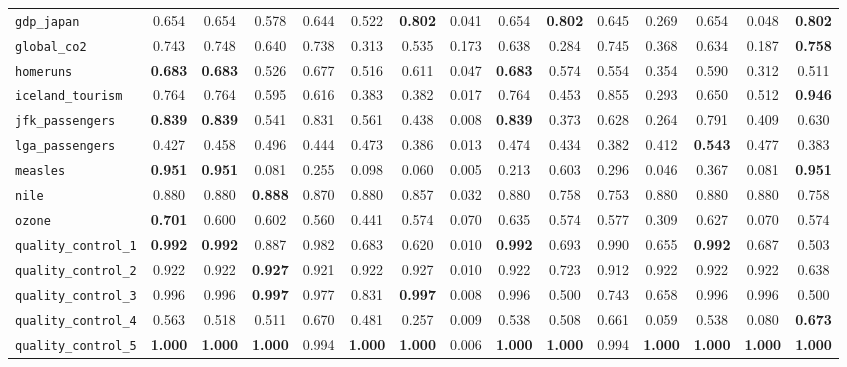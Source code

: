 \begin{tabular}{lcccccccccccccc}
\verb+gdp_japan+ & 0.654 & 0.654 & 0.578 & 0.644 & 0.522 & \textbf{0.802} & 0.041 & 0.654 & \textbf{0.802} & 0.645 & 0.269 & 0.654 & 0.048 & \textbf{0.802}\\
\verb+global_co2+ & 0.743 & 0.748 & 0.640 & 0.738 & 0.313 & 0.535 & 0.173 & 0.638 & 0.284 & 0.745 & 0.368 & 0.634 & 0.187 & \textbf{0.758}\\
\verb+homeruns+ & \textbf{0.683} & \textbf{0.683} & 0.526 & 0.677 & 0.516 & 0.611 & 0.047 & \textbf{0.683} & 0.574 & 0.554 & 0.354 & 0.590 & 0.312 & 0.511\\
\verb+iceland_tourism+ & 0.764 & 0.764 & 0.595 & 0.616 & 0.383 & 0.382 & 0.017 & 0.764 & 0.453 & 0.855 & 0.293 & 0.650 & 0.512 & \textbf{0.946}\\
\verb+jfk_passengers+ & \textbf{0.839} & \textbf{0.839} & 0.541 & 0.831 & 0.561 & 0.438 & 0.008 & \textbf{0.839} & 0.373 & 0.628 & 0.264 & 0.791 & 0.409 & 0.630\\
\verb+lga_passengers+ & 0.427 & 0.458 & 0.496 & 0.444 & 0.473 & 0.386 & 0.013 & 0.474 & 0.434 & 0.382 & 0.412 & \textbf{0.543} & 0.477 & 0.383\\
\verb+measles+ & \textbf{0.951} & \textbf{0.951} & 0.081 & 0.255 & 0.098 & 0.060 & 0.005 & 0.213 & 0.603 & 0.296 & 0.046 & 0.367 & 0.081 & \textbf{0.951}\\
\verb+nile+ & 0.880 & 0.880 & \textbf{0.888} & 0.870 & 0.880 & 0.857 & 0.032 & 0.880 & 0.758 & 0.753 & 0.880 & 0.880 & 0.880 & 0.758\\
\verb+ozone+ & \textbf{0.701} & 0.600 & 0.602 & 0.560 & 0.441 & 0.574 & 0.070 & 0.635 & 0.574 & 0.577 & 0.309 & 0.627 & 0.070 & 0.574\\
\verb+quality_control_1+ & \textbf{0.992} & \textbf{0.992} & 0.887 & 0.982 & 0.683 & 0.620 & 0.010 & \textbf{0.992} & 0.693 & 0.990 & 0.655 & \textbf{0.992} & 0.687 & 0.503\\
\verb+quality_control_2+ & 0.922 & 0.922 & \textbf{0.927} & 0.921 & 0.922 & 0.927 & 0.010 & 0.922 & 0.723 & 0.912 & 0.922 & 0.922 & 0.922 & 0.638\\
\verb+quality_control_3+ & 0.996 & 0.996 & \textbf{0.997} & 0.977 & 0.831 & \textbf{0.997} & 0.008 & 0.996 & 0.500 & 0.743 & 0.658 & 0.996 & 0.996 & 0.500\\
\verb+quality_control_4+ & 0.563 & 0.518 & 0.511 & 0.670 & 0.481 & 0.257 & 0.009 & 0.538 & 0.508 & 0.661 & 0.059 & 0.538 & 0.080 & \textbf{0.673}\\
\verb+quality_control_5+ & \textbf{1.000} & \textbf{1.000} & \textbf{1.000} & 0.994 & \textbf{1.000} & \textbf{1.000} & 0.006 & \textbf{1.000} & \textbf{1.000} & 0.994 & \textbf{1.000} & \textbf{1.000} & \textbf{1.000} & \textbf{1.000}\\

\end{tabular}
